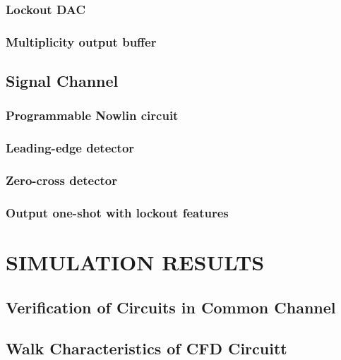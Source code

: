 \documentclass[12pt,oneside,final]{siuethesis}
\theoremstyle{definition}
\begin{document}
\subsection{Lockout DAC}

\subsection{Multiplicity output buffer}



\section{Signal Channel}

\subsection{Programmable Nowlin circuit}

\subsection{Leading-edge detector}

\subsection{Zero-cross detector}


\subsection{Output one-shot with lockout features}





\chapter{SIMULATION RESULTS}

\section{Verification of Circuits in Common Channel}

\section{Walk Characteristics of CFD Circuitt}
\end{document}
